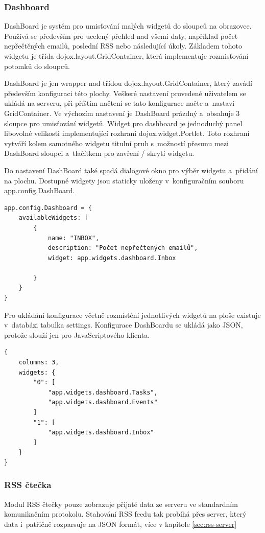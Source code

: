 \documentclass[bc,male,html,dept460]{diploma}				%
\begin{document}
\subsubsection{Dashboard}
DashBoard je systém pro umisťování malých widgetů do sloupců na obrazovce. Používá se především pro ucelený přehled nad všemi daty, například počet nepřečtěných emailů, poslední RSS nebo následující úkoly. Základem tohoto widgetu je třída dojox.layout.GridContainer, která implementuje rozmisťování potomků do sloupců.

DashBoard je jen wrapper nad třídou dojox.layout.GridContainer, který zavádí především konfiguraci této plochy.
Veškeré nastavení provedené uživatelem se ukládá na serveru, při příštím načtení se tato konfigurace načte a~nastaví GridContainer.
Ve výchozím nastavení je DashBoard prázdný a~obsahuje 3 sloupce pro umisťování widgetů. Widget pro dashboard je jednoduchý panel libovolné velikosti implementující rozhraní dojox.widget.Portlet. Toto rozhraní vytváří kolem samotného widgetu titulní pruh s~možností přesunu mezi DashBoard sloupci a~tlačítkem pro zavření / skrytí widgetu.

Do nastavení DashBoard také spadá dialogové okno pro výběr widgetu a~přidání na plochu. Dostupné widgety jsou staticky uloženy v~konfiguračním souboru app.config.DashBoard.
\bigskip
\begin{lstlisting}[label=src:JavaScript,caption=Konfigurace widgetu v~DashBoard]
app.config.Dashboard = {
	availableWidgets: [
		{
			name: "INBOX",
			description: "Počet nepřečtených emailů",
			widget: app.widgets.dashboard.Inbox
			
		}
	}
}
\end{lstlisting}

Pro ukládání konfigurace včetně rozmístění jednotlivých widgetů na ploše existuje v~databázi tabulka settings. Konfigurace DashBoardu se ukládá jako JSON, protože slouží jen pro JavaScriptového klienta.
\newpage
\begin{lstlisting}[label=src:JavaScript,caption=Konfigurace DashBoardu]
{
	columns: 3,
	widgets: {
		"0": [
			"app.widgets.dashboard.Tasks",
			"app.widgets.dashboard.Events"
		]
		"1": [
			"app.widgets.dashboard.Inbox"
		]
	}
}
\end{lstlisting}



\subsubsection{RSS čtečka}
Modul RSS čtečky pouze zobrazuje přijaté data ze serveru ve standardním komunikačním protokolu. Stahování RSS feedu tak probíhá přes server, který data i~patřičně rozparsuje na JSON formát, více v kapitole \ref{sec:rss-server}
\end{document}
